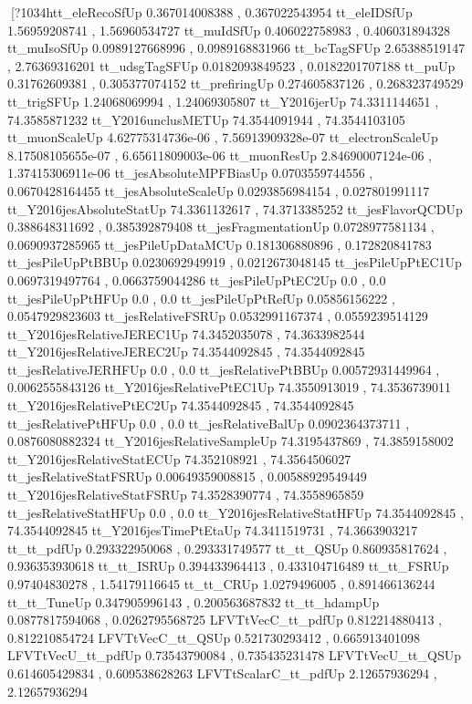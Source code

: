[?1034htt_eleRecoSfUp
0.367014008388 , 0.367022543954
tt_eleIDSfUp
1.56959208741 , 1.56960534727
tt_muIdSfUp
0.406022758983 , 0.406031894328
tt_muIsoSfUp
0.0989127668996 , 0.0989168831966
tt_bcTagSFUp
2.65388519147 , 2.76369316201
tt_udsgTagSFUp
0.0182093849523 , 0.0182201707188
tt_puUp
0.31762609381 , 0.305377074152
tt_prefiringUp
0.274605837126 , 0.268323749529
tt_trigSFUp
1.24068069994 , 1.24069305807
tt_Y2016jerUp
74.3311144651 , 74.3585871232
tt_Y2016unclusMETUp
74.3544091944 , 74.3544103105
tt_muonScaleUp
4.62775314736e-06 , 7.56913909328e-07
tt_electronScaleUp
8.17508105655e-07 , 6.65611809003e-06
tt_muonResUp
2.84690007124e-06 , 1.37415306911e-06
tt_jesAbsoluteMPFBiasUp
0.0703559744556 , 0.0670428164455
tt_jesAbsoluteScaleUp
0.0293856984154 , 0.027801991117
tt_Y2016jesAbsoluteStatUp
74.3361132617 , 74.3713385252
tt_jesFlavorQCDUp
0.388648311692 , 0.385392879408
tt_jesFragmentationUp
0.0728977581134 , 0.0690937285965
tt_jesPileUpDataMCUp
0.181306880896 , 0.172820841783
tt_jesPileUpPtBBUp
0.0230692949919 , 0.0212673048145
tt_jesPileUpPtEC1Up
0.0697319497764 , 0.0663759044286
tt_jesPileUpPtEC2Up
0.0 , 0.0
tt_jesPileUpPtHFUp
0.0 , 0.0
tt_jesPileUpPtRefUp
0.05856156222 , 0.0547929823603
tt_jesRelativeFSRUp
0.0532991167374 , 0.0559239514129
tt_Y2016jesRelativeJEREC1Up
74.3452035078 , 74.3633982544
tt_Y2016jesRelativeJEREC2Up
74.3544092845 , 74.3544092845
tt_jesRelativeJERHFUp
0.0 , 0.0
tt_jesRelativePtBBUp
0.00572931449964 , 0.0062555843126
tt_Y2016jesRelativePtEC1Up
74.3550913019 , 74.3536739011
tt_Y2016jesRelativePtEC2Up
74.3544092845 , 74.3544092845
tt_jesRelativePtHFUp
0.0 , 0.0
tt_jesRelativeBalUp
0.0902364373711 , 0.0876080882324
tt_Y2016jesRelativeSampleUp
74.3195437869 , 74.3859158002
tt_Y2016jesRelativeStatECUp
74.352108921 , 74.3564506027
tt_jesRelativeStatFSRUp
0.00649359008815 , 0.00588929549449
tt_Y2016jesRelativeStatFSRUp
74.3528390774 , 74.3558965859
tt_jesRelativeStatHFUp
0.0 , 0.0
tt_Y2016jesRelativeStatHFUp
74.3544092845 , 74.3544092845
tt_Y2016jesTimePtEtaUp
74.3411519731 , 74.3663903217
tt_tt_pdfUp
0.293322950068 , 0.293331749577
tt_tt_QSUp
0.860935817624 , 0.936353930618
tt_tt_ISRUp
0.394433964413 , 0.433104716489
tt_tt_FSRUp
0.97404830278 , 1.54179116645
tt_tt_CRUp
1.0279496005 , 0.891466136244
tt_tt_TuneUp
0.347905996143 , 0.200563687832
tt_tt_hdampUp
0.0877817594068 , 0.0262795568725
LFVTtVecC_tt_pdfUp
0.812214880413 , 0.812210854724
LFVTtVecC_tt_QSUp
0.521730293412 , 0.665913401098
LFVTtVecU_tt_pdfUp
0.73543790084 , 0.735435231478
LFVTtVecU_tt_QSUp
0.614605429834 , 0.609538628263
LFVTtScalarC_tt_pdfUp
2.12657936294 , 2.12657936294
